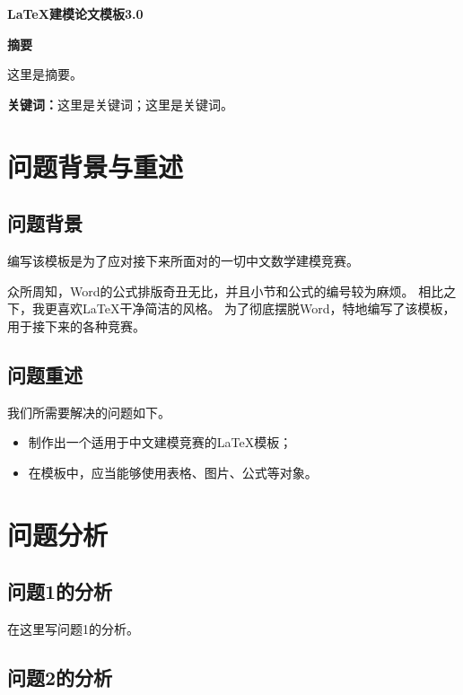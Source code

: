 \documentclass[12pt, a4paper, oneside]{ctexart}
\begin{document}
\pagestyle{empty}
\setcounter{page}{0}

\begin{center}
    \Large{\textbf{\LaTeX 建模论文模板3.0}}
\end{center}

\begin{center}
    \Large{\textbf{摘要}}
\end{center}

这里是摘要。

\textbf{关键词：}这里是关键词；这里是关键词。

\newpage
\setcounter{page}{1}
\pagestyle{plain}
\fancyfoot[C]{\thepage}

\section{问题背景与重述}

\subsection{问题背景}

编写该模板是为了应对接下来所面对的一切中文数学建模竞赛。

众所周知，Word的公式排版奇丑无比，并且小节和公式的编号较为麻烦。
相比之下，我更喜欢\LaTeX 干净简洁的风格。
为了彻底摆脱Word，特地编写了该模板，用于接下来的各种竞赛。

\subsection{问题重述}

我们所需要解决的问题如下。
\begin{itemize}
    \item 制作出一个适用于中文建模竞赛的\LaTeX 模板；
    \item 在模板中，应当能够使用表格、图片、公式等对象。
\end{itemize}

\section{问题分析}

\subsection{问题1的分析}

在这里写问题1的分析。

\subsection{问题2的分析}
\end{document}
